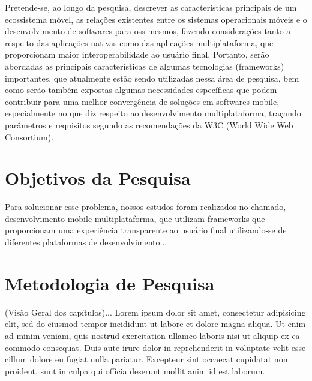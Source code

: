 Pretende-se, ao longo da pesquisa, descrever as características principais de um ecossistema móvel, as
relações existentes entre os sistemas operacionais móveis e o desenvolvimento de softwares para oss
mesmos, fazendo considerações tanto a respeito das aplicações nativas como das aplicações
multiplataforma, que proporcionam maior interoperabilidade ao usuário final. Portanto, serão abordadas as
principais características de algumas tecnologias (frameworks) importantes, que atualmente estão sendo
utilizadas nessa área de pesquisa, bem como serão também expostas algumas necessidades específicas que
podem contribuir para uma melhor convergência de soluções em softwares mobile, especialmente no que diz
respeito ao desenvolvimento multiplataforma, traçando parâmetros e requisitos segundo as recomendações
da W3C (World Wide Web Consortium).

\section{Objetivos da Pesquisa} %
\label{sec:objetivos}
Para solucionar esse problema, nossos estudos foram realizados no
chamado, desenvolvimento mobile multiplataforma, que utilizam frameworks que
proporcionam uma experiência transparente ao usuário final utilizando-se de
diferentes plataformas de desenvolvimento...

\section{Metodologia de Pesquisa} %
\label{sec:metodologia_de_pesquisa}
(Visão Geral dos capítulos)...
Lorem ipsum dolor sit amet, consectetur adipisicing elit, sed do eiusmod
tempor incididunt ut labore et dolore magna aliqua. Ut enim ad minim veniam,
quis nostrud exercitation ullamco laboris nisi ut aliquip ex ea commodo
consequat. Duis aute irure dolor in reprehenderit in voluptate velit esse
cillum dolore eu fugiat nulla pariatur. Excepteur sint occaecat cupidatat non
proident, sunt in culpa qui officia deserunt mollit anim id est laborum.


